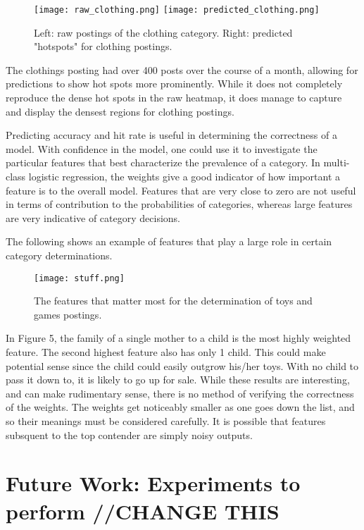 \documentclass[12pt]{article}
\begin{document}
   \begin{figure}[h]
   \centering
   \texttt{[image: raw\_clothing.png]}
   \texttt{[image: predicted\_clothing.png]}
   \caption{Left: raw postings of the clothing category. Right: predicted "hotspots" for clothing postings.}
   \end{figure}

   The clothings posting had over 400 posts over the course of a month, allowing for predictions to show hot spots more prominently. While it does not completely reproduce the dense hot spots in the raw heatmap, it does manage to capture and display the densest regions for clothing postings. 

   Predicting accuracy and hit rate is useful in determining the correctness of a model. With confidence in the model, one could use it to investigate the particular features that best characterize the prevalence of a category.
   In multi-class logistic regression, the weights give a good indicator of how important a feature is to the overall model. Features that are very close to zero are not useful in terms of contribution to the probabilities of categories, whereas large features are very indicative of category decisions. 

   The following shows an example of features that play a large role in certain category determinations. 

   \begin{figure}[h]
   \centering
   \texttt{[image: stuff.png]}
   \caption{The features that matter most for the determination of toys and games postings.}
   \end{figure}

   In Figure 5, the family of a single mother to a child is the most highly weighted feature. The second highest feature also has only 1 child. This could make potential sense since the child could easily outgrow his/her toys. With no child to pass it down to, it is likely to go up for sale. 
   While these results are interesting, and can make rudimentary sense, there is no method of verifying the correctness of the weights. The weights get noticeably smaller as one goes down the list, and so their meanings must be considered carefully. It is possible that features subsquent to the top contender are simply noisy outputs. 

   \newpage
   \section{Future Work: Experiments to perform //CHANGE THIS}
\end{document}
